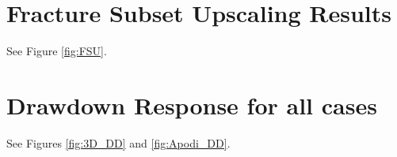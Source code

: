 \documentclass[a4paper]{article}
\begin{document}
	\section{Fracture Subset Upscaling Results}
	See Figure \ref{fig:FSU}.
	
	
	\section{Drawdown Response for all cases}
	See Figures \ref{fig:3D_DD} and \ref{fig:Apodi_DD}.
	
	
	
\end{document}
